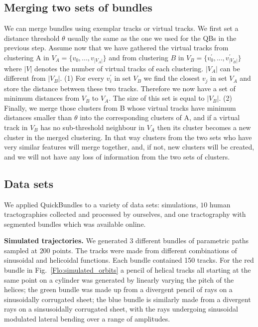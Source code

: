 \documentclass[journal]{IEEEtran}
\begin{document}
\subsection{Merging two sets of bundles\label{sub:merging}}

We can merge bundles using exemplar tracks or virtual tracks. We first
set a distance threshold $\theta$ usually the same as the one we used
for the QBs in the previous step. Assume now that we have gathered the
virtual tracks from clustering A in $V_{A}=\{v_{0},...,v_{|V_{A}|}\}$
and from clustering $B$ in $V_{B}=\{v_{0}^{'},...,v_{|V_{B}|}^{'}\}$
where $|V|$ denotes the number of virtual tracks of each clustering.
$|V_{A}|$ can be different from $|V_{B}|$. (1) For every $v_{i}^{'}$ in set
$V_{B}$ we find the closest $v_{j}$ in set $V_{A}$ and store the
distance between these two tracks. Therefore we now have a set of
minimum distances from $V_{B}$ to $V_{A}$. The size of this set is equal
to $|V_{B}|$. (2) Finally, we merge those clusters from B whose virtual
tracks have minimum distances smaller than $\theta$ into the
corresponding clusters of A, and if a virtual track in $V_{B}$ has no
sub-threshold neighbour in $V_{A}$ then its cluster becomes a new
cluster in the merged clustering. In that way clusters from the two sets
who have very similar features will merge together, and, if not, new
clusters will be created, and we will not have any loss of information
from the two sets of clusters.

\subsection{\label{sub:QB-Data-sets}Data sets}

We applied QuickBundles to a variety of data sets: simulations, $10$ human
tractographies collected and processed by ourselves, and one tractography
with segmented bundles which was available online.

\textbf{Simulated trajectories.} We generated $3$ different bundles of
parametric paths sampled at $200$ points. The tracks were made from
different combinations of sinusoidal and helicoidal functions.  Each
bundle contained 150 tracks.  For the red bundle in
Fig.~\ref{Flo:simulated_orbits} a pencil of helical tracks all starting
at the same point on a cylinder was generated by linearly varying the
pitch of the helices; the green bundle was made up from a divergent
pencil of rays on a sinusoidally corrugated sheet; the blue bundle is
similarly made from a divergent rays on a sinsusoidally corrugated
sheet, with the rays undergoing sinusoidal modulated lateral bending
over a range of amplitudes.
\end{document}
